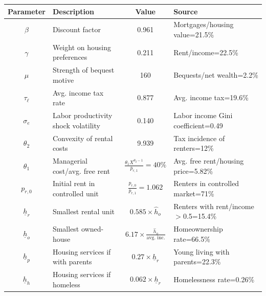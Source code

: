 \begin{table}[p]
\footnotesize
\renewcommand{\arraystretch}{1.2}
\begin{center}
\begin{tabular}{clcl}\toprule
Parameter & Description & Value & Source\\
\midrule
$\beta$ & Discount factor & 0.961 & Mortgages/housing value=21.5\% \\
$\gamma$ & Weight on housing preferences & 0.211 & Rent/income=22.5\% \\
$\mu$ & Strength of bequest motive & 160 & Bequests/net wealth=2.2\% \\
$\tau_{\ell}$ & Avg. income tax rate & 0.877 & Avg. income tax=19.6\% \\
$\sigma_{e}$ & Labor productivity shock volatility & 0.140 & Labor income Gini coefficient=0.49 \\
$\theta_{2}$ & Convexity of rental costs & 9.939 & Tax incidence of renters=12\% \\
$\theta_{1}$ & Managerial cost/avg. free rent & $\frac{\theta_{1}X^{\theta_{2}-1}}{\overline{p}_{r,1}}=40\%$ & Avg. free rent/housing price=5.82\% \\
$p_{r,0}$ & Initial rent in controlled unit & $\frac{p_{r,0}}{\overline{p}_{r,1}}=1.062$ & Renters in controlled market=71\% \\
$\underline{h}_{r}$ & Smallest rental unit & $0.585 \times \hat{h}_{o}$  & Renters with rent/income$>$0.5=15.4\% \\
$\underline{h}_{o}$ & Smallest owned-house & $6.17 \times \frac{\hat{h}_{o}}{\mbox{avg. inc.}}$ & Homeownership rate=66.5\% \\
$\underline{h}_{p}$ & Housing services if with parents & $0.27 \times \underline{h}_{r}$ & Young living with parents=22.3\% \\
$\underline{h}_{h}$ & Housing services if homeless & $0.062 \times \underline{h}_{r}$ & Homelessness rate=0.26\% \\
\bottomrule
\bottomrule
\end{tabular}
\end{center}
\normalsize
\end{table}
